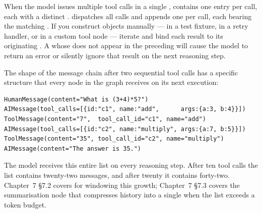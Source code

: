 \begin{warningbox}
When the model issues multiple tool calls in a single ,
 contains one entry per call, each with a
distinct .  dispatches all calls and appends one
 per call, each bearing the matching .
If you construct  objects manually --- in a test fixture,
in a retry handler, or in a custom tool node --- iterate
 and bind each result to its originating
. A  whose  does not
appear in the preceding  will cause
the model to return an error or silently ignore that result on the
next reasoning step.
\end{warningbox}

The shape of the message chain after two sequential tool calls has a
specific structure that every node in the graph receives on its next
execution:

\begin{verbatim}
HumanMessage(content="What is (3+4)*5?")
AIMessage(tool_calls=[{id:"c1", name:"add",      args:{a:3, b:4}}])
ToolMessage(content="7",  tool_call_id="c1", name="add")
AIMessage(tool_calls=[{id:"c2", name:"multiply", args:{a:7, b:5}}])
ToolMessage(content="35", tool_call_id="c2", name="multiply")
AIMessage(content="The answer is 35.")
\end{verbatim}

The model receives this entire list on every reasoning step. After ten
tool calls the list contains twenty-two messages, and after twenty it
contains forty-two. Chapter~7 \S7.2 covers  for
windowing this growth; Chapter~7 \S7.3 covers the summarisation node that
compresses history into a single  when the list exceeds
a token budget.

